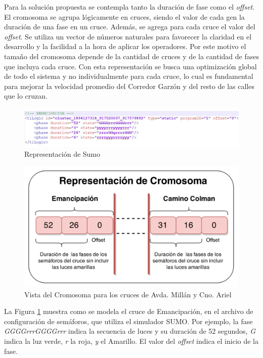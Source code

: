 Para la solución propuesta se contempla tanto la duración de fase como el \emph{offset}. El cromosoma se agrupa lógicamente en cruces, siendo el valor de cada gen la duración de una
fase en un cruce. Además, se agrega para cada cruce el valor del \emph{offset}. Se utiliza un vector de números naturales para favorecer la claridad en el desarrollo y la facilidad a la hora de aplicar los operadores. Por este motivo el tamaño del cromosoma depende de la cantidad de cruces y de la cantidad de fases que incluya cada cruce. Con esta representación se busca una optimización global de todo el sistema y no individualmente para cada cruce, lo cual es fundamental para mejorar la velocidad promedio del Corredor Garzón y del resto de las calles que lo cruzan.
\begin{figure}[H]
	\centering
	\includegraphics[width=\linewidth]{Figures/rep_sumo}
	\caption{Representación de Sumo}
	\label{fig:rep_sumo}
\end{figure}


\begin{figure}[H]
	\centering
	\includegraphics[width=0.8\linewidth]{Figures/cromosoma1}
	\caption{Vista del Cromosoma para los cruces de Avda. Millán y Cno. Ariel}
	\label{fig:cromosoma1}
\end{figure}


La Figura \ref{fig:rep_sumo} muestra como se modela el cruce de Emancipación, en el archivo de configuración de semáforos, que utiliza el simulador SUMO. Por ejemplo, la fase \emph{GGGGrrrGGGGrrr} indica la secuencia de luces y su duración de 52 segundos, \emph{G} indica la luz verde, \emph{r} la roja, \emph{y} el Amarillo. El valor del \emph{offset} indica el inicio de la fase.

